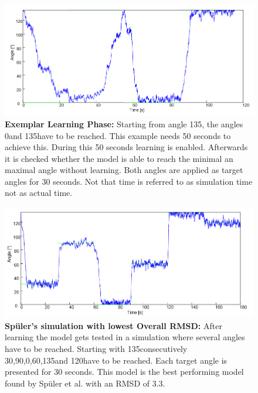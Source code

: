 \begin{figure}[tb]
	\centering
	\includegraphics[width=0.7\linewidth]{figures/ModelSebastian/ExemplarLearning}
	\caption[Exemplar Learning Phase]{\textbf{Exemplar Learning Phase:} Starting from angle 135\degree, the angles 0\degree and 135\degree have to be reached. This example needs 50 seconds to achieve this. During this 50 seconds learning is enabled. Afterwards it is checked whether the model is able to reach the minimal an maximal angle without learning. Both angles are applied as target angles for 30 seconds. Not that time is referred to as simulation time not as actual time. \cite[p. 47]{sebastianMasterThesis}}
	\label{fig:exemplarlearning}
\end{figure}

\begin{figure}[tb]
	\centering
	\includegraphics[width=0.7\linewidth]{figures/ModelSebastian/LowestOverallRMSD}
	\caption[Spüler's Lowest Overall RMSD]{\textbf{Spüler's simulation with lowest Overall RMSD:} After learning the model gets tested in a simulation where several angles have to be reached. Starting with 135\degree consecutively 30\degree,90\degree,0\degree,60\degree,135\degree and 120\degree have to be reached. Each target angle is presented for 30 seconds. This model is the best performing model found by Spüler et al. with an RMSD of 3.3\degree. \cite[p. 52]{sebastianMasterThesis}}
	\label{fig:lowestoverallrmsd}
\end{figure}


